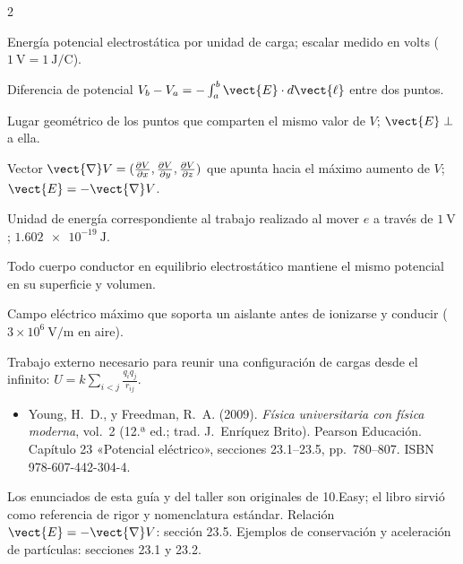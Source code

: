 \documentclass[11pt]{article}
\begin{document}
\begin{multicols}{2}\small\begin{description}[leftmargin=0pt,itemsep=1pt,font=\sffamily\bfseries\color{e10primary}]
  \item[Potencial eléctrico $V$.] Energía potencial electrostática por unidad de carga; escalar medido en volts ($1\ \mathrm{V}=1\ \mathrm{J/C}$).
  \item[Voltaje $\Delta V$.] Diferencia de potencial $V_b-V_a=-\int_a^b\vect{E}\cdot d\vect{\ell}$ entre dos puntos.
  \item[Superficie equipotencial.] Lugar geométrico de los puntos que comparten el mismo valor de $V$; $\vect{E}\perp$ a ella.
  \item[Gradiente de potencial.] Vector $\vect{\nabla}V=(\frac{\partial V}{\partial x},\frac{\partial V}{\partial y},\frac{\partial V}{\partial z})$ que apunta hacia el máximo aumento de $V$; $\vect{E}=-\vect{\nabla}V$.
  \item[Electrón-volt ($\mathrm{eV}$).] Unidad de energía correspondiente al trabajo realizado al mover $e$ a través de $\SI{1}{\volt}$; $\SI{1,602e-19}{\joule}$.
  \item[Conductor equipotencial.] Todo cuerpo conductor en equilibrio electrostático mantiene el mismo potencial en su superficie y volumen.
  \item[Rigidez dieléctrica.] Campo eléctrico máximo que soporta un aislante antes de ionizarse y conducir ($3\times10^6\ \mathrm{V/m}$ en aire).
  \item[Energía de ensamble.] Trabajo externo necesario para reunir una configuración de cargas desde el infinito: $U=k\sum_{i<j}\frac{q_iq_j}{r_{ij}}$.
\end{description}\end{multicols}

{\small
\begin{itemize}[leftmargin=*,itemsep=3pt]
  \item Young, H.~D., y Freedman, R.~A. (2009). \emph{Física universitaria con física moderna}, vol.~2 (12.ª ed.; trad. J.~Enríquez Brito). Pearson Educación. Capítulo 23 «Potencial eléctrico», secciones 23.1--23.5, pp.~780--807. ISBN 978-607-442-304-4.
\end{itemize}
{\color{e10muted}Los enunciados de esta guía y del taller son originales de 10.Easy; el libro sirvió como referencia de rigor y nomenclatura estándar. Relación $\vect{E}=-\vect{\nabla}V$: sección 23.5. Ejemplos de conservación y aceleración de partículas: secciones 23.1 y 23.2.}}
\end{document}
